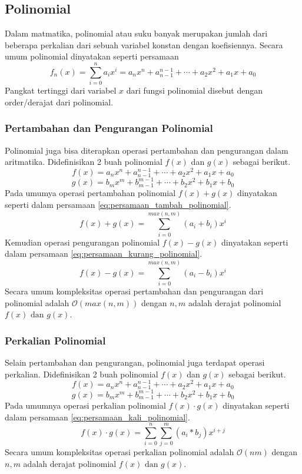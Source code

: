 \subsection{Polinomial}
Dalam matmatika, polinomial atau suku banyak merupakan jumlah dari beberapa perkalian dari sebuah variabel konstan dengan koefisiennya\cite{}. Secara umum polinomial dinyatakan seperti persamaan \label{eq:persamaan_umum_polinomial}
\begin{equation}
	f_n(x) = \sum_{i=0}^{n} a_i x^i = a_n x^n + a_{n-1}^{n-1} + \cdots + a_2x^2 + a_1x + a_0
	\label{eq:persamaan_umum_polinomial}
\end{equation}
Pangkat tertinggi dari variabel $ x $ dari fungsi polinomial disebut dengan order/derajat dari polinomial.

\subsubsection{Pertambahan dan Pengurangan Polinomial}
Polinomial juga bisa diterapkan operasi pertambahan dan pengurangan dalam aritmatika. 
Didefinisikan 2 buah polinomial $f(x)$ dan $g(x)$ sebagai berikut.
$$ f(x) = a_n x^n + a_{n-1}^{n-1} + \cdots + a_2x^2 + a_1x + a_0 $$
$$ g(x) = b_m x^m + b_{m-1}^{m-1} + \cdots + b_2x^2 + b_1x + b_0 $$
Pada umumya operasi pertambahan polinomial $ f(x) + g(x) $ dinyatakan seperti dalam persamaan \eqref{eq:persamaan_tambah_polinomial}.
\begin{equation}
	f(x) + g(x) = \sum_{i=0}^{max(n,m)} (a_i + b_i) x^i
	\label{eq:persamaan_tambah_polinomial} 
\end{equation}
Kemudian operasi pengurangan polinomial $ f(x) - g(x) $ dinyatakan seperti dalam persamaan \eqref{eq:persamaan_kurang_polinomial}.
\begin{equation}
	f(x) - g(x) = \sum_{i=0}^{max(n,m)} (a_i - b_i) x^i
	\label{eq:persamaan_kurang_polinomial} 
\end{equation}
Secara umum kompleksitas operasi pertambahan dan pengurangan dari polinomial adalah $ \mathcal{O}{(max(n,m))} $ dengan $ n , m $ adalah derajat polinomial $ f(x) \text{ dan } g(x) $.

\subsubsection{Perkalian Polinomial}
Selain pertambahan dan pengurangan, polinomial juga terdapat operasi perkalian.
Didefinisikan 2 buah polinomial $f(x)$ dan $g(x)$ sebagai berikut.
$$ f(x) = a_n x^n + a_{n-1}^{n-1} + \cdots + a_2x^2 + a_1x + a_0 $$
$$ g(x) = b_m x^m + b_{m-1}^{m-1} + \cdots + b_2x^2 + b_1x + b_0 $$
Pada umumnya operasi perkalian polinomial $ f(x) \cdot g(x) $ dinyatakan seperti dalam persamaan \eqref{eq:persamaan_kali_polinomial}.
\begin{equation}
	f(x) \cdot g(x) = \sum_{i=0}^{n} \sum_{j=0}^{m} (a_i * b_j) x^{i+j}
	\label{eq:persamaan_kali_polinomial}
\end{equation}
Secara umum kompleksitas operasi perkalian polinomial adalah $ \mathcal{O}{(nm)} $ dengan $ n , m $ adalah derajat polinomial $ f(x) \text{ dan } g(x) $.

